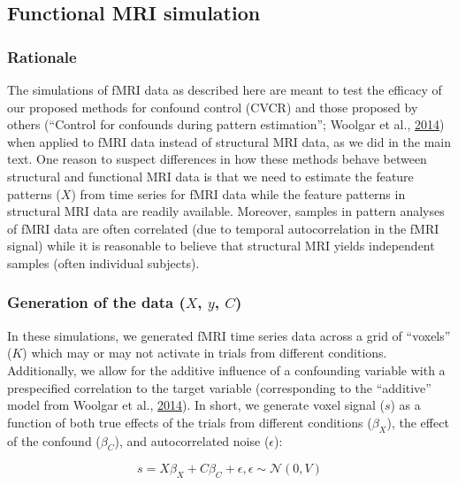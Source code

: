 \documentclass[11pt,american,a4paper,oneside,]{memoir} %
\begin{document}
\hypertarget{functional-mri-simulation}{%
\subsection{Functional MRI simulation}\label{functional-mri-simulation}}

\hypertarget{rationale}{%
\subsubsection{Rationale}\label{rationale}}

The simulations of fMRI data as described here are meant to test the efficacy of our proposed methods for confound control (CVCR) and those proposed by others (``Control for confounds during pattern estimation''; Woolgar et al., \protect\hyperlink{ref-Woolgar2014-jb}{2014}) when applied to fMRI data instead of structural MRI data, as we did in the main text. One reason to suspect differences in how these methods behave between structural and functional MRI data is that we need to estimate the feature patterns (\(X\)) from time series for fMRI data while the feature patterns in structural MRI data are readily available. Moreover, samples in pattern analyses of fMRI data are often correlated (due to temporal autocorrelation in the fMRI signal) while it is reasonable to believe that structural MRI yields independent samples (often individual subjects).

\hypertarget{generation-of-the-data-x-y-c}{%
\subsubsection{\texorpdfstring{Generation of the data (\(X\), \(y\), \(C\))}{Generation of the data (X, y, C)}}\label{generation-of-the-data-x-y-c}}

In these simulations, we generated fMRI time series data across a grid of ``voxels'' (\(K\)) which may or may not activate in trials from different conditions. Additionally, we allow for the additive influence of a confounding variable with a prespecified correlation to the target variable (corresponding to the ``additive'' model from Woolgar et al., \protect\hyperlink{ref-Woolgar2014-jb}{2014}). In short, we generate voxel signal (\(s\)) as a function of both true effects of the trials from different conditions (\(\beta_{X}\)), the effect of the confound (\(\beta_{C}\)), and autocorrelated noise (\(\epsilon\)):

\begin{equation}
s = X\beta_{X} + C\beta_{C} + \epsilon, \epsilon \sim \mathcal{N}(0, V)
\end{equation}
\end{document}
